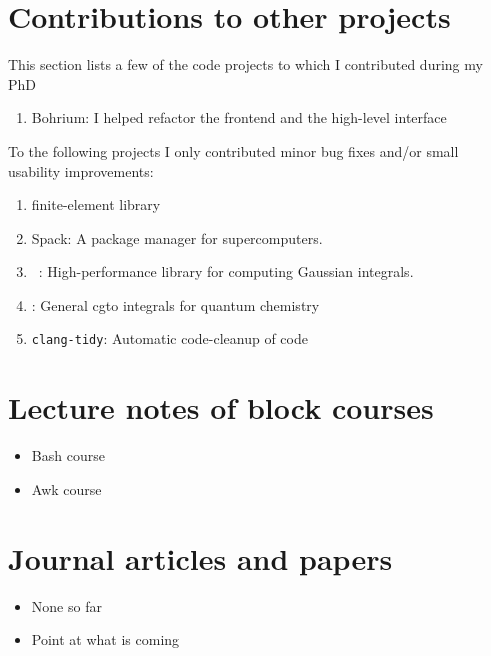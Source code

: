 \section*{Contributions to other projects}
This section lists a few of the code projects to which I contributed
during my PhD

\begin{enumerate}
	\item Bohrium: I helped refactor the \cpp frontend and the high-level
		\cpp interface
\end{enumerate}
%
To the following projects I only contributed minor bug fixes and/or small
usability improvements:
\begin{enumerate}
	\addtocounter{enumi}{1}
	\item \dealii{} finite-element library
	\item Spack: A package manager for supercomputers.
	\item \libint~\cite{Libint2,Libint2_231}:
		High-performance library for computing Gaussian integrals.
	\item \libcint{}: General cgto integrals for quantum chemistry
	\item \texttt{clang-tidy}: Automatic code-cleanup of \cpp code
\end{enumerate}

\section*{Lecture notes of block courses}
\begin{itemize}
	\item Bash course\cite{BashCourse2015}
	\item Awk course\cite{AwkCourse2016}
\end{itemize}

\section*{Journal articles and papers}
\begin{itemize}
	\item None so far
	\item Point at what is coming
\end{itemize}
